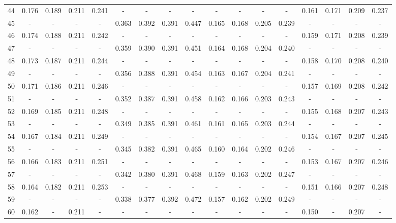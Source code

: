 \documentclass{report}
\begin{document}
\begin{appendices}
\begin{table}
\begin{tabular}{|c|cccc|cccc|cccc|cccc|}
44 & 0.176 & 0.189 & 0.211 & 0.241 &   -   &   -   &   -   &   -   &   -   &   -   &   -   &   -   & 0.161 & 0.171 & 0.209 & 0.237\\
45 &   -   &   -   &   -   &   -   & 0.363 & 0.392 & 0.391 & 0.447 & 0.165 & 0.168 & 0.205 & 0.239 &   -   &   -   &   -   &   -  \\
46 & 0.174 & 0.188 & 0.211 & 0.242 &   -   &   -   &   -   &   -   &   -   &   -   &   -   &   -   & 0.159 & 0.171 & 0.208 & 0.239\\
47 &   -   &   -   &   -   &   -   & 0.359 & 0.390 & 0.391 & 0.451 & 0.164 & 0.168 & 0.204 & 0.240 &   -   &   -   &   -   &   -  \\
48 & 0.173 & 0.187 & 0.211 & 0.244 &   -   &   -   &   -   &   -   &   -   &   -   &   -   &   -   & 0.158 & 0.170 & 0.208 & 0.240\\
49 &   -   &   -   &   -   &   -   & 0.356 & 0.388 & 0.391 & 0.454 & 0.163 & 0.167 & 0.204 & 0.241 &   -   &   -   &   -   &   -  \\
50 & 0.171 & 0.186 & 0.211 & 0.246 &   -   &   -   &   -   &   -   &   -   &   -   &   -   &   -   & 0.157 & 0.169 & 0.208 & 0.242\\
51 &   -   &   -   &   -   &   -   & 0.352 & 0.387 & 0.391 & 0.458 & 0.162 & 0.166 & 0.203 & 0.243 &   -   &   -   &   -   &   -  \\
52 & 0.169 & 0.185 & 0.211 & 0.248 &   -   &   -   &   -   &   -   &   -   &   -   &   -   &   -   & 0.155 & 0.168 & 0.207 & 0.243\\
53 &   -   &   -   &   -   &   -   & 0.349 & 0.385 & 0.391 & 0.461 & 0.161 & 0.165 & 0.203 & 0.244 &   -   &   -   &   -   &   -  \\
54 & 0.167 & 0.184 & 0.211 & 0.249 &   -   &   -   &   -   &   -   &   -   &   -   &   -   &   -   & 0.154 & 0.167 & 0.207 & 0.245\\
55 &   -   &   -   &   -   &   -   & 0.345 & 0.382 & 0.391 & 0.465 & 0.160 & 0.164 & 0.202 & 0.246 &   -   &   -   &   -   &   -  \\
56 & 0.166 & 0.183 & 0.211 & 0.251 &   -   &   -   &   -   &   -   &   -   &   -   &   -   &   -   & 0.153 & 0.167 & 0.207 & 0.246\\
57 &   -   &   -   &   -   &   -   & 0.342 & 0.380 & 0.391 & 0.468 & 0.159 & 0.163 & 0.202 & 0.247 &   -   &   -   &   -   &   -  \\
58 & 0.164 & 0.182 & 0.211 & 0.253 &   -   &   -   &   -   &   -   &   -   &   -   &   -   &   -   & 0.151 & 0.166 & 0.207 & 0.248\\
59 &   -   &   -   &   -   &   -   & 0.338 & 0.377 & 0.392 & 0.472 & 0.157 & 0.162 & 0.202 & 0.249 &   -   &   -   &   -   &   -  \\
60 & 0.162 &   -   & 0.211 &   -   &   -   &   -   &   -   &   -   &   -   &   -   &   -   &   -   & 0.150 &   -   & 0.207 &   -  \\
\hline
\end{tabular}
\end{table}


\end{appendices}
\end{document}
